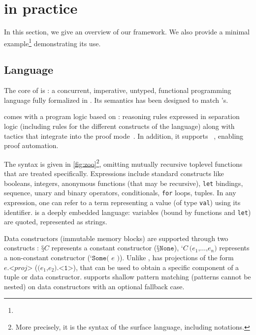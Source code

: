 \section{\Zoo in practice}
\label{sec:zoo}




In this section, we give an overview of our framework.
We also provide a minimal example\footnote{} demonstrating its use.

\subsection{Language}

The core of \Zoo is \ZooLang: a concurrent, imperative, untyped, functional programming language fully formalized in \Rocq.
Its semantics has been designed to match \OCaml's.

\ZooLang comes with a program logic based on \Iris: reasoning rules expressed in separation logic (including rules for the different constructs of the language) along with \Rocq tactics that integrate into the \Iris proof mode~\cite{DBLP:conf/popl/KrebbersTB17,DBLP:journals/pacmpl/KrebbersJ0TKTCD18}.
In addition, it supports \Diaframe~\cite{DBLP:conf/pldi/MulderKG22,DBLP:journals/pacmpl/MulderK23}, enabling proof automation.

The \ZooLang syntax is given in \cref{fig:zoo}\footnote{More precisely, it is the syntax of the surface language, including \Rocq notations.}, omitting mutually recursive toplevel functions that are treated specifically.
Expressions include standard constructs like booleans, integers, anonymous functions (that may be recursive), \texttt{let} bindings, sequence, unary and binary operators, conditionals, \texttt{for} loops, tuples.
In any expression, one can refer to a \Rocq term representing a \ZooLang value (of type \texttt{val}) using its \Rocq identifier.
\ZooLang is a deeply embedded language: variables (bound by functions and \texttt{let}) are quoted, represented as strings.

Data constructors (immutable memory blocks) are supported through two constructs : $\texttt{§}C$ represents a constant constructor (\eg $\texttt{§}\texttt{None}$), $\texttt{‘} C\ \texttt{(} e_1 \texttt{,} \dots \texttt{,} e_n \texttt{)}$ represents a non-constant constructor (\eg $\texttt{‘} \texttt{Some( } e \texttt{ )}$).
Unlike \OCaml, \ZooLang has projections of the form $e \texttt{.<} \mathit{proj} \texttt{>}$ (\eg $\texttt{(} e_1 \texttt{,} e_2 \texttt{).<1>}$), that can be used to obtain a specific component of a tuple or data constructor.
\ZooLang supports shallow pattern matching (patterns cannot be nested) on data constructors with an optional fallback case.


